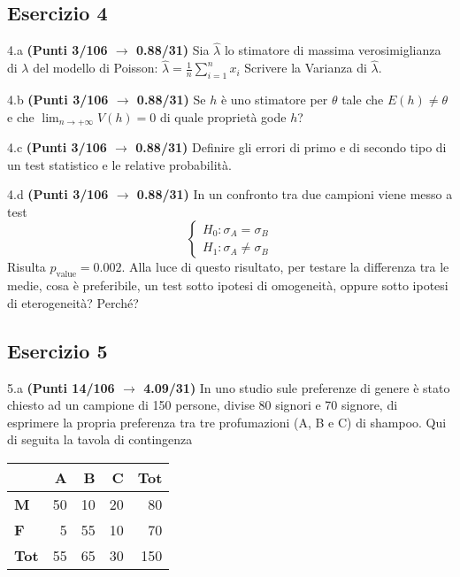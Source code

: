 \documentclass[
  11pt,
]{book}
\theoremstyle{mytheoremstyle}
\theoremstyle{mydefstyle}
\begin{document}
\subsection{Esercizio 4}\label{esercizio-4-16}

4.a \textbf{(Punti 3/106 \(\rightarrow\) 0.88/31)} Sia \(\hat \lambda\) lo stimatore di massima verosimiglianza di \(\lambda\) del modello di Poisson: \(\hat\lambda =  \frac 1n\sum_{i=1}^nx_i\)
Scrivere la Varianza di \(\hat \lambda\).

4.b \textbf{(Punti 3/106 \(\rightarrow\) 0.88/31)} Se \(h\) è uno stimatore per \(\theta\) tale che
\(E(h)\ne \theta\) e che \(\lim_ {n\to +\infty}V(h)=0\) di quale proprietà gode \(h\)?

4.c \textbf{(Punti 3/106 \(\rightarrow\) 0.88/31)} Definire gli errori di primo e di secondo
tipo di un test statistico e le relative probabilità.

4.d \textbf{(Punti 3/106 \(\rightarrow\) 0.88/31)} In un confronto tra due campioni viene messo a test
\[
\begin{cases}
H_0:\sigma_A=\sigma_B\\
H_1:\sigma_A\ne \sigma_B
\end{cases}
\]
Risulta \(p_\text{value}=0.002\). Alla luce di questo risultato, per testare la differenza tra le medie, cosa è preferibile, un test sotto ipotesi di omogeneità, oppure sotto ipotesi di eterogeneità? Perché?

\subsection{Esercizio 5}\label{esercizio-5-14}

5.a \textbf{(Punti 14/106 \(\rightarrow\) 4.09/31)} In uno studio sule preferenze di genere è stato chiesto ad un campione di 150 persone,
divise 80 signori e 70 signore, di esprimere la propria preferenza tra tre profumazioni (A, B e C)
di shampoo.
Qui di seguita la tavola di contingenza

\begin{table}[H]
\centering
\begin{tabular}{>{}lrrrr}
\toprule
  & A & B & C & Tot\\
\midrule
\textbf{M} & 50 & 10 & 20 & 80\\
\textbf{F} & 5 & 55 & 10 & 70\\
\textbf{Tot} & 55 & 65 & 30 & 150\\
\bottomrule
\end{tabular}
\end{table}
\end{document}
